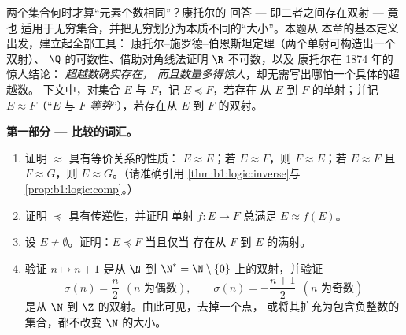 \begin{problem}\label{pb:b1:logic:1}
两个集合何时才算“元素个数相同”？康托尔的
回答 --- 即二者之间存在双射 --- 竟也
适用于无穷集合，并把无穷划分为本质不同的“大小”。本题从
本章的基本定义出发，建立起全部工具：
康托尔--施罗德--伯恩斯坦定理（两个单射可构造出一个双射）、
$\Q$ 的可数性、借助对角线法证明 $\R$ 不可数，以及
康托尔在 1874 年的惊人结论：
\emph{超越数确实存在，
而且数量多得惊人}，却无需写出哪怕一个具体的超越数。
下文中，对集合 $E$ 与 $F$，记 $E \preceq F$，若存在
从 $E$ 到 $F$ 的单射；并记 $E \approx F$（“$E$ 与
$F$ \emph{等势}”），若存在从 $E$
到 $F$ 的双射。

\medskip
\noindent\textbf{第一部分 --- 比较的词汇。}
\begin{enumerate}
  \item 证明 $\approx$ 具有等价关系的性质：
        $E \approx E$；若 $E \approx F$，则 $F \approx E$；若
        $E \approx F$ 且 $F \approx G$，则 $E \approx G$。（请准确引用
        \cref{thm:b1:logic:inverse}与
        \cref{prop:b1:logic:comp}。）
  \item 证明 $\preceq$ 具有传递性，并证明
        单射 $f \colon E \to F$ 总满足 $E \approx f(E)$。
  \item 设 $E \neq \emptyset$。证明：$E \preceq F$ 当且仅当
        存在从 $F$ 到 $E$ 的满射。
  \item 验证 $n \mapsto n + 1$ 是从 $\N$ 到
        $\N^* = \N \setminus \{0\}$ 上的双射，并验证
        \[
        \sigma(n) = \frac n2 \ \ (n \text{ 为偶数}), \qquad
        \sigma(n) = -\frac{n+1}2 \ \ (n \text{ 为奇数})
        \]
        是从 $\N$ 到 $\Z$ 的双射。由此可见，去掉一个点，
        或将其扩充为包含负整数的集合，都不改变
        $\N$ 的大小。
\end{enumerate}


\end{problem}
